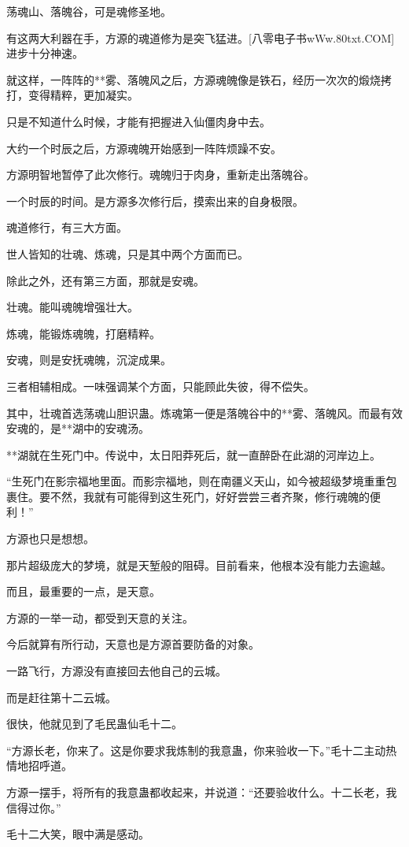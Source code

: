 \begin{this_body}
荡魂山、落魄谷，可是魂修圣地。

有这两大利器在手，方源的魂道修为是突飞猛进。[八零电子书wWw.80txt.COM]进步十分神速。

就这样，一阵阵的**雾、落魄风之后，方源魂魄像是铁石，经历一次次的煅烧拷打，变得精粹，更加凝实。

只是不知道什么时候，才能有把握进入仙僵肉身中去。

大约一个时辰之后，方源魂魄开始感到一阵阵烦躁不安。

方源明智地暂停了此次修行。魂魄归于肉身，重新走出落魄谷。

一个时辰的时间。是方源多次修行后，摸索出来的自身极限。

魂道修行，有三大方面。

世人皆知的壮魂、炼魂，只是其中两个方面而已。

除此之外，还有第三方面，那就是安魂。

壮魂。能叫魂魄增强壮大。

炼魂，能锻炼魂魄，打磨精粹。

安魂，则是安抚魂魄，沉淀成果。

三者相辅相成。一味强调某个方面，只能顾此失彼，得不偿失。

其中，壮魂首选荡魂山胆识蛊。炼魂第一便是落魄谷中的**雾、落魄风。而最有效安魂的，是**湖中的安魂汤。

**湖就在生死门中。传说中，太日阳莽死后，就一直醉卧在此湖的河岸边上。

“生死门在影宗福地里面。而影宗福地，则在南疆义天山，如今被超级梦境重重包裹住。要不然，我就有可能得到这生死门，好好尝尝三者齐聚，修行魂魄的便利！”

方源也只是想想。

那片超级庞大的梦境，就是天堑般的阻碍。目前看来，他根本没有能力去逾越。

而且，最重要的一点，是天意。

方源的一举一动，都受到天意的关注。

今后就算有所行动，天意也是方源首要防备的对象。

一路飞行，方源没有直接回去他自己的云城。

而是赶往第十二云城。

很快，他就见到了毛民蛊仙毛十二。

“方源长老，你来了。这是你要求我炼制的我意蛊，你来验收一下。”毛十二主动热情地招呼道。

方源一摆手，将所有的我意蛊都收起来，并说道：“还要验收什么。十二长老，我信得过你。”

毛十二大笑，眼中满是感动。


\end{this_body}
